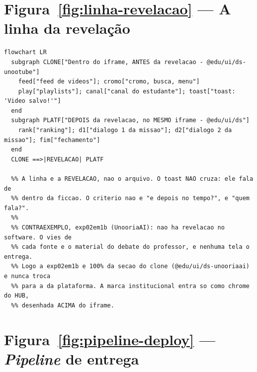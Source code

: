 \section{Figura~\ref{fig:linha-revelacao} --- A linha da revelação}

\begin{lstlisting}[language=mermaid]
flowchart LR
  subgraph CLONE["Dentro do iframe, ANTES da revelacao - @edu/ui/ds-unootube"]
    feed["feed de videos"]; cromo["cromo, busca, menu"]
    play["playlists"]; canal["canal do estudante"]; toast["toast: 'Video salvo!'"]
  end
  subgraph PLATF["DEPOIS da revelacao, no MESMO iframe - @edu/ui/ds"]
    rank["ranking"]; d1["dialogo 1 da missao"]; d2["dialogo 2 da missao"]; fim["fechamento"]
  end
  CLONE ==>|REVELACAO| PLATF

  %% A linha e a REVELACAO, nao o arquivo. O toast NAO cruza: ele fala de
  %% dentro da ficcao. O criterio nao e "e depois no tempo?", e "quem fala?".
  %%
  %% CONTRAEXEMPLO, exp02em1b (UnooriaAI): nao ha revelacao no software. O vies de
  %% cada fonte e o material do debate do professor, e nenhuma tela o entrega.
  %% Logo a exp02em1b e 100% da secao do clone (@edu/ui/ds-unooriaai) e nunca troca
  %% para a da plataforma. A marca institucional entra so como chrome do HUB,
  %% desenhada ACIMA do iframe.
\end{lstlisting}

\section{Figura~\ref{fig:pipeline-deploy} --- \emph{Pipeline} de entrega}

